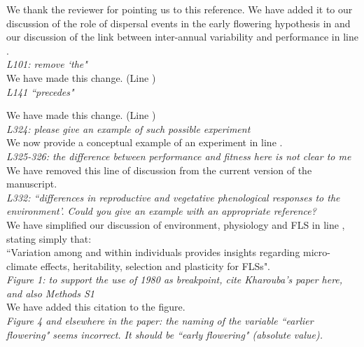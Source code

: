 \documentclass{article}[11pt]
\begin{document}
\noindent We thank the reviewer for pointing us to this reference. We have added it to our discussion of the role of dispersal events in the early flowering hypothesis in  and our discussion of the link between inter-annual variability and performance in line .\\
 
\emph{L101: remove `the"}\\

We have made this change. (Line )\\

\emph{L141 ``precedes"}

We have made this change. (Line )\\

\emph{L324: please give an example of such possible experiment}\\

\noindent We now provide a conceptual example of an experiment in line .\\

\emph{L325-326: the difference between performance and fitness here is not clear to me}\\

\noindent We have removed this line of discussion from the current version of the manuscript.\\

\emph{L332: ``differences in reproductive and vegetative phenological responses to the environment'. Could you give an example with an appropriate reference?}\\

\noindent We have simplified our discussion of environment, physiology and FLS in line , stating simply that:\\
\indent ``Variation among and within individuals provides insights regarding  micro-climate effects, heritability, selection and plasticity for FLSs".\\

\emph{Figure 1: to support the use of 1980 as breakpoint, cite Kharouba's paper here, and also Methods S1}\\

\noindent We have added this citation to the figure.\\

\emph{Figure 4 and elsewhere in the paper: the naming of the variable ``earlier flowering" seems incorrect. It should be ``early flowering" (absolute value).}\\
\end{document}
